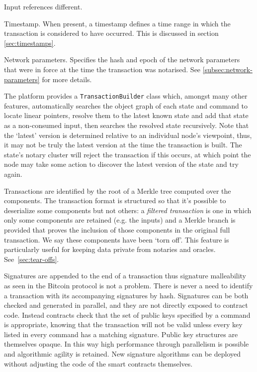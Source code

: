 \documentclass{article}
\begin{document}
\begin{labeling}{Input references}
different.
\item [Timestamp.] When present, a timestamp defines a time range in which the transaction is considered to
have occurred. This is discussed in section \cref{sec:timestamps}.
\item [Network parameters.] Specifies the hash and epoch of the network parameters that were in force at the time the
transaction was notarised. See \cref{subsec:network-parameters} for more details.
\end{labeling}


The platform provides a \texttt{TransactionBuilder} class which, amongst many other features, automatically
searches the object graph of each state and command to locate linear pointers, resolve them to the latest known
state and add that state as a non-consumed input, then searches the resolved state recursively. Note that the `latest' version is determined relative to an
individual node's viewpoint, thus, it may not be truly the latest version at the time the transaction is built. The
state's notary cluster will reject the transaction if this occurs, at which point the node may take some action to
discover the latest version of the state and try again.

Transactions are identified by the root of a Merkle tree computed over the components. The transaction format is
structured so that it's possible to deserialize some components but not others: a \emph{filtered transaction} is
one in which only some components are retained (e.g. the inputs) and a Merkle branch is provided that proves the
inclusion of those components in the original full transaction. We say these components have been `torn off'. This
feature is particularly useful for keeping data private from notaries and oracles. See~\cref{sec:tear-offs}.

Signatures are appended to the end of a transaction thus signature malleability as seen in the Bitcoin protocol is
not a problem. There is never a need to identify a transaction with its accompanying signatures by hash. Signatures
can be both checked and generated in parallel, and they are not directly exposed to contract code. Instead
contracts check that the set of public keys specified by a command is appropriate, knowing that the transaction
will not be valid unless every key listed in every command has a matching signature. Public key structures are
themselves opaque. In this way high performance through parallelism is possible and algorithmic agility is
retained. New signature algorithms can be deployed without adjusting the code of the smart contracts themselves.
\end{document}
